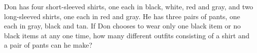 Don has four short-sleeved shirts, one each in black, white, red and gray, and two long-sleeved shirts, one each in red and gray. He has three pairs of pants, one each in gray, black and tan. If Don chooses to wear only one black item or no black items at any one time, how many different outfits consisting of a shirt and a pair of pants can he make?
